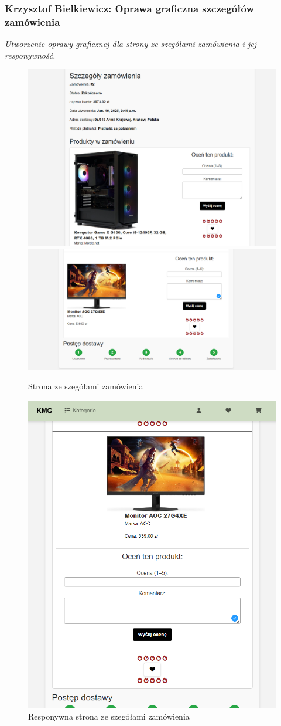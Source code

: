 \documentclass[12pt,a4paper,oneside]{article}
\theoremstyle{definition}
\numberwithin{equation}{section}
\begin{document}
\subsubsection{Krzysztof Bielkiewicz: Oprawa graficzna szczegółów zamówienia}
\label{1.3.11}
\textit{Utworzenie oprawy graficznej dla strony ze szegółami zamówienia i jej responywność.}

\begin{figure}[H]
    \centering
    \includegraphics[width=0.8\columnwidth]{images/krzysztofBImages/szczegóły-zamówieniaV1.png}
    \includegraphics[width=0.8\columnwidth]{images/krzysztofBImages/szczegóły-zamówieniaV2.png}
    \caption{Strona ze szegółami zamówienia}
\end{figure}

\begin{figure}[H]
    \centering
    \includegraphics[width=0.5\columnwidth]{images/krzysztofBImages/szczegóły-zamówienia-respo.png}
    \caption{Responywna strona ze szegółami zamówienia}
\end{figure}
\end{document}
